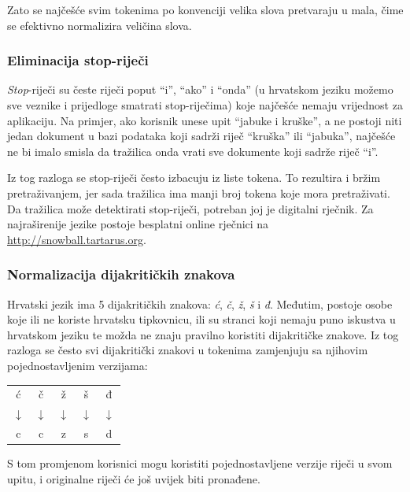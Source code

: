 \documentclass[a4paper,twoside,12pt]{scrreprt}
\newenvironment{nscenter}
 {\par\nopagebreak\centering}
 {\parskip=0pt\par\noindent\ignorespacesafterend}
\begin{document}
Zato se najčešće svim tokenima po konvenciji velika slova pretvaraju u mala, čime se efektivno normalizira veličina slova.

\subsubsection{Eliminacija stop-riječi}

\textit{Stop}-riječi su česte riječi poput ``i'', ``ako'' i ``onda'' (u hrvatskom jeziku možemo sve veznike i prijedloge smatrati stop-riječima) koje najčešće nemaju vrijednost za aplikaciju. Na primjer, ako korisnik unese upit ``jabuke i kruške'', a ne postoji niti jedan dokument u bazi podataka koji sadrži riječ ``kruška'' ili ``jabuka'', najčešće ne bi imalo smisla da tražilica onda vrati sve dokumente koji sadrže riječ ``i''.

Iz tog razloga se stop-riječi često izbacuju iz liste tokena. To rezultira i bržim pretraživanjem, jer sada tražilica ima manji broj tokena koje mora pretraživati. Da tražilica može detektirati stop-riječi, potreban joj je digitalni rječnik. Za najraširenije jezike postoje besplatni online rječnici na \url{http://snowball.tartarus.org}.

\subsubsection{Normalizacija dijakritičkih znakova}

Hrvatski jezik ima 5 dijakritičkih znakova: \textit{ć}, \textit{č}, \textit{ž}, \textit{š} i \textit{đ}. Međutim, postoje osobe koje ili ne koriste hrvatsku tipkovnicu, ili su stranci koji nemaju puno iskustva u hrvatskom jeziku te možda ne znaju pravilno koristiti dijakritičke znakove. Iz tog razloga se često svi dijakritički znakovi u tokenima zamjenjuju sa njihovim pojednostavljenim verzijama:

\begin{nscenter}
  \begin{tabular}{ccccc}
    ć            & č            & ž            & š            & đ            \\
    $\downarrow$ & $\downarrow$ & $\downarrow$ & $\downarrow$ & $\downarrow$ \\
    c            & c            & z            & s            & d            \\
  \end{tabular}
\end{nscenter}

S tom promjenom korisnici mogu koristiti pojednostavljene verzije riječi u svom upitu, i originalne riječi će još uvijek biti pronađene.
\end{document}
